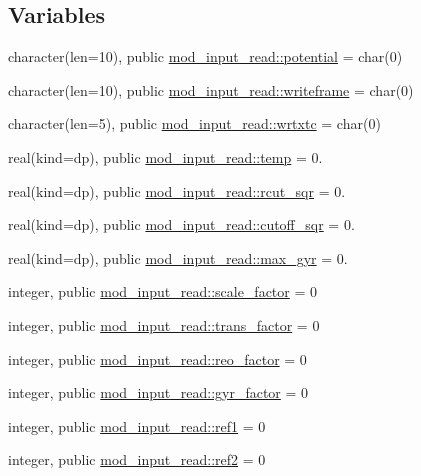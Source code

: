 \subsection*{Variables}
\begin{DoxyCompactItemize}
\item 
character(len=10), public \hyperlink{namespacemod__input__read_aaf9a85c22da4f3ae7bbcc9ba72d783dd}{mod\+\_\+input\+\_\+read\+::potential} = char(0)
\item 
character(len=10), public \hyperlink{namespacemod__input__read_a02f99bb5470feaf35ab2fc228c797f64}{mod\+\_\+input\+\_\+read\+::writeframe} = char(0)
\item 
character(len=5), public \hyperlink{namespacemod__input__read_af757b04e60563ace187ed465be839553}{mod\+\_\+input\+\_\+read\+::wrtxtc} = char(0)
\item 
real(kind=dp), public \hyperlink{namespacemod__input__read_a584082766fe740d0c5f3975d3d44426b}{mod\+\_\+input\+\_\+read\+::temp} = 0.
\item 
real(kind=dp), public \hyperlink{namespacemod__input__read_ad2ddb7a8a7af94da8a7d12c6e3ab9899}{mod\+\_\+input\+\_\+read\+::rcut\+\_\+sqr} = 0.
\item 
real(kind=dp), public \hyperlink{namespacemod__input__read_a9ef9305fdc4e5164af51f0da464c36c0}{mod\+\_\+input\+\_\+read\+::cutoff\+\_\+sqr} = 0.
\item 
real(kind=dp), public \hyperlink{namespacemod__input__read_a3f3cf0bf8b5ebc1886d493eda84eecf4}{mod\+\_\+input\+\_\+read\+::max\+\_\+gyr} = 0.
\item 
integer, public \hyperlink{namespacemod__input__read_a55be21acb2dc4800c8d3cecf28e4166f}{mod\+\_\+input\+\_\+read\+::scale\+\_\+factor} = 0
\item 
integer, public \hyperlink{namespacemod__input__read_ae958873dff0867f0aa04dbf6cd8a1166}{mod\+\_\+input\+\_\+read\+::trans\+\_\+factor} = 0
\item 
integer, public \hyperlink{namespacemod__input__read_ab81a502be00c6796c9474d728db96041}{mod\+\_\+input\+\_\+read\+::reo\+\_\+factor} = 0
\item 
integer, public \hyperlink{namespacemod__input__read_a76985d277087bc52f1b81814fe4c50bc}{mod\+\_\+input\+\_\+read\+::gyr\+\_\+factor} = 0
\item 
integer, public \hyperlink{namespacemod__input__read_ae009fc7ba8243327aec0bed57f18b515}{mod\+\_\+input\+\_\+read\+::ref1} = 0
\item 
integer, public \hyperlink{namespacemod__input__read_a72ae0812ca16c5cbb7eb3cbe12bafb58}{mod\+\_\+input\+\_\+read\+::ref2} = 0

\end{DoxyCompactItemize}

